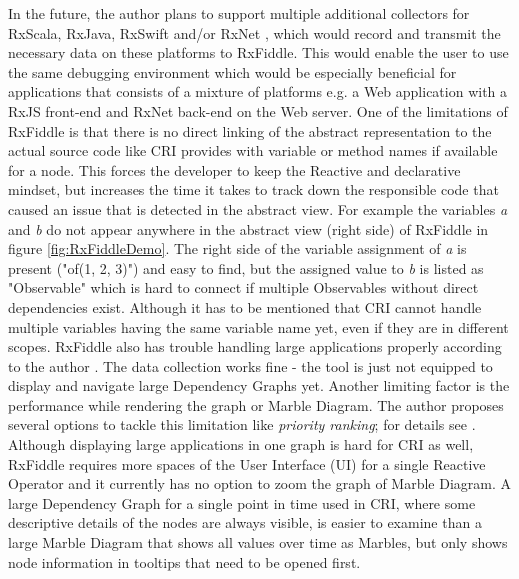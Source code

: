 	In the future, the author plans to support multiple additional collectors for RxScala, RxJava, RxSwift and/or RxNet \cite{RxFiddleTutorials}, which would record and transmit the necessary data on these platforms to RxFiddle. This would enable the user to use the same debugging environment which would be especially beneficial for applications that consists of a mixture of platforms e.g. a Web application with a RxJS front-end and RxNet back-end on the Web server.
	One of the limitations of RxFiddle is that there is no direct linking of the abstract representation to the actual source code like CRI provides with variable or method names if available for a node. This forces the developer to keep the Reactive and declarative mindset, but increases the time it takes to track down the responsible code that caused an issue that is detected in the abstract view. For example the variables \emph{a} and \emph{b} do not appear anywhere in the abstract view (right side) of RxFiddle in figure \ref{fig:RxFiddleDemo}. The right side of the variable assignment of \emph{a} is present ("of(1, 2, 3)") and easy to find, but the assigned value to \emph{b} is listed as "Observable" which is hard to connect if multiple Observables without direct dependencies exist. Although it has to be mentioned that CRI cannot handle multiple variables having the same variable name yet, even if they are in different scopes.
	RxFiddle also has trouble handling large applications properly according to the author \cite[Issue 6]{RxFiddleGitHub}. The data collection works fine - the tool is just not equipped to display and navigate large Dependency Graphs yet. Another limiting factor is the performance while rendering the graph or Marble Diagram. The author proposes several options to tackle this limitation like \emph{priority ranking}; for details see \cite[Issue 6]{RxFiddleGitHub}. Although displaying large applications in one graph is hard for CRI as well, RxFiddle requires more spaces of the User Interface (UI) for a single Reactive Operator and it currently has no option to zoom the graph of Marble Diagram. A large Dependency Graph for a single point in time used in CRI, where some descriptive details of the nodes are always visible, is easier to examine than a large Marble Diagram that shows all values over time as Marbles, but only shows node information in tooltips that need to be opened first.
